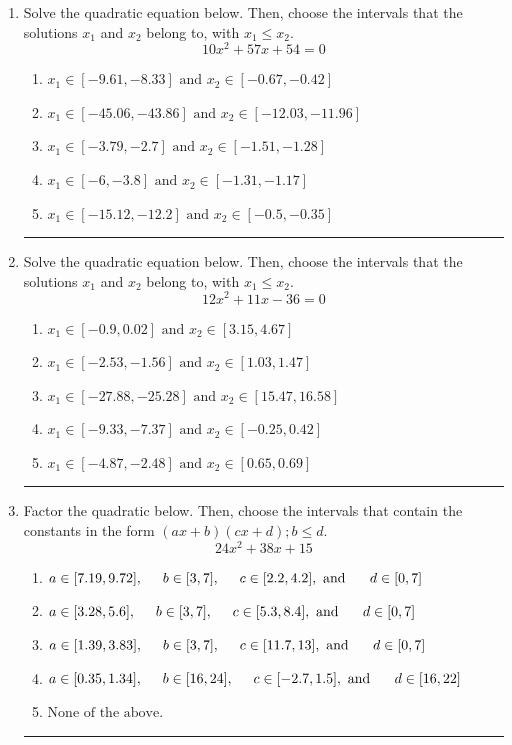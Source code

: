 \documentclass[14pt]{extbook}
\newcommand{\litem}[1]{\item#1\hspace*{-1cm}\rule{\textwidth}{0.4pt}}
\begin{document}
\begin{enumerate}
\litem{
Solve the quadratic equation below. Then, choose the intervals that the solutions $x_1$ and $x_2$ belong to, with $x_1 \leq x_2$.\[ 10x^{2} +57 x + 54 = 0 \]\begin{enumerate}[label=\Alph*.]
\item \( x_1 \in [-9.61, -8.33] \text{ and } x_2 \in [-0.67, -0.42] \)
\item \( x_1 \in [-45.06, -43.86] \text{ and } x_2 \in [-12.03, -11.96] \)
\item \( x_1 \in [-3.79, -2.7] \text{ and } x_2 \in [-1.51, -1.28] \)
\item \( x_1 \in [-6, -3.8] \text{ and } x_2 \in [-1.31, -1.17] \)
\item \( x_1 \in [-15.12, -12.2] \text{ and } x_2 \in [-0.5, -0.35] \)

\end{enumerate} }
\litem{
Solve the quadratic equation below. Then, choose the intervals that the solutions $x_1$ and $x_2$ belong to, with $x_1 \leq x_2$.\[ 12x^{2} +11 x -36 = 0 \]\begin{enumerate}[label=\Alph*.]
\item \( x_1 \in [-0.9, 0.02] \text{ and } x_2 \in [3.15, 4.67] \)
\item \( x_1 \in [-2.53, -1.56] \text{ and } x_2 \in [1.03, 1.47] \)
\item \( x_1 \in [-27.88, -25.28] \text{ and } x_2 \in [15.47, 16.58] \)
\item \( x_1 \in [-9.33, -7.37] \text{ and } x_2 \in [-0.25, 0.42] \)
\item \( x_1 \in [-4.87, -2.48] \text{ and } x_2 \in [0.65, 0.69] \)

\end{enumerate} }
\litem{
Factor the quadratic below. Then, choose the intervals that contain the constants in the form $(ax+b)(cx+d); b \leq d.$\[ 24x^{2} +38 x + 15 \]\begin{enumerate}[label=\Alph*.]
\item \( a \in [7.19, 9.72], \hspace*{5mm} b \in [3, 7], \hspace*{5mm} c \in [2.2, 4.2], \text{ and } \hspace*{5mm} d \in [0, 7] \)
\item \( a \in [3.28, 5.6], \hspace*{5mm} b \in [3, 7], \hspace*{5mm} c \in [5.3, 8.4], \text{ and } \hspace*{5mm} d \in [0, 7] \)
\item \( a \in [1.39, 3.83], \hspace*{5mm} b \in [3, 7], \hspace*{5mm} c \in [11.7, 13], \text{ and } \hspace*{5mm} d \in [0, 7] \)
\item \( a \in [0.35, 1.34], \hspace*{5mm} b \in [16, 24], \hspace*{5mm} c \in [-2.7, 1.5], \text{ and } \hspace*{5mm} d \in [16, 22] \)
\item \( \text{None of the above.} \)


\end{enumerate}}
\end{enumerate}
\end{document}
